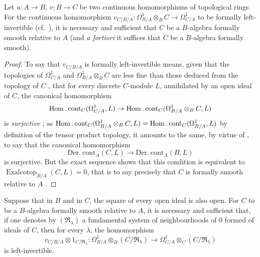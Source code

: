 \begin{proposition}[20.7.2]
\label{0.20.7.2}
Let $u:A\to B$, $v:B\to C$ be two continuous homomorphisms of topological rings.
For the continuous homomorphism $v_{C/B/A}:\Omega^1_{B/A}\otimes_B C\to\Omega^1_{C/A}$ to be formally left-invertible \textup{(}cf.\ \textup{)}, it is necessary and sufficient that $C$ be a $B$-algebra formally smooth relative to $A$  \textup{(}and \emph{a fortiori} it suffices that $C$ be a $B$-algebra formally smooth\textup{)}.
\end{proposition}

\begin{proof}
To say that $v_{C/B/A}$ is formally left-invertible means, given that the topologies of $\Omega^1_{C/A}$ and $\Omega^1_{B/A}\otimes_B C$ are less fine than those deduced from the topology of $C$ , that for every discrete $C$-module $L$, annihilated by an open ideal of $C$, the canonical homomorphism
\[
  \operatorname{Hom}.\operatorname{cont}_C(\Omega^1_{C/A},L)\to\operatorname{Hom}.\operatorname{cont}_C(\Omega^1_{B/A}\otimes_B C,L)
\]
is \emph{surjective} ; as $\operatorname{Hom}.\operatorname{cont}_C(\Omega^1_{B/A}\otimes_B C,L)=\operatorname{Hom}.\operatorname{cont}_C(\Omega^1_{B/A},L)$ by definition of the tensor product topology, it amounts to the same, by virtue of , to say that the canonical homomorphism
\[
  \operatorname{D\acute{e}r.\ cont}_A(C,L)\to\operatorname{D\acute{e}r.\ cont}_A(B,L)
\]
is surjective.
But the exact sequence  shows that this condition is equivalent to $\operatorname{Exalcotop}_{B/A}(C,L)=0$, that is to say precisely that $C$ is formally smooth relative to $A$ .
\end{proof}

\begin{corollary}[20.7.3]
\label{0.20.7.3}
Suppose that in $B$ and in $C$, the square of every open ideal is also open.
For $C$ to be a $B$-algebra formally smooth relative to $A$, it is necessary and sufficient that, if one denotes by $(\mathfrak{R}_\lambda)$ a fundamental system of neighbourhoods of $0$ formed of ideals of $C$, then for every $\lambda$, the homomorphism
\begin{equation}
\tag{20.7.3.1}
  \label{0.20.7.3.1}
  v_{C/B/A}\otimes 1_{C/\mathfrak{R}_\lambda}:\Omega^1_{B/A}\otimes_B(C/\mathfrak{R}_\lambda)\to\Omega^1_{C/A}\otimes_C(C/\mathfrak{R}_\lambda)
\end{equation}
is left-invertible.
\end{corollary}

